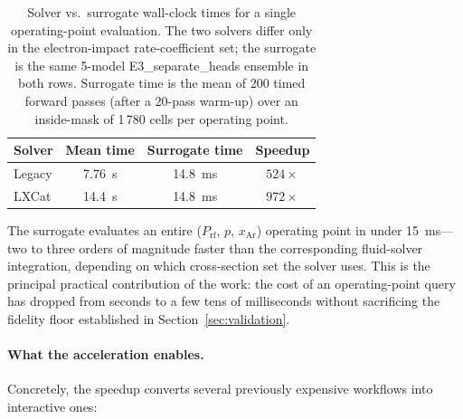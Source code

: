 \documentclass[12pt,a4paper]{article}
\begin{document}
\begin{table}[H]
  \centering
  \caption{Solver vs.\ surrogate wall-clock times for a single
operating-point evaluation.  The two solvers differ only in the
electron-impact rate-coefficient set; the surrogate is the same
5-model E3\_separate\_heads ensemble in both rows.  Surrogate time is
the mean of 200 timed forward passes (after a 20-pass warm-up) over an
inside-mask of 1\,780 cells per operating point.}
  \label{tab:speedup}
  \begin{tabular}{lccc}
    \toprule
    Solver & Mean time & Surrogate time & Speedup \\
    \midrule
    Legacy & \SI{7.76}{\second} & \SI{14.8}{\milli\second}
           & $524\times$ \\
    LXCat  & \SI{14.4}{\second} & \SI{14.8}{\milli\second}
           & $972\times$ \\
    \bottomrule
  \end{tabular}
\end{table}

The surrogate evaluates an entire (\(P_\mathrm{rf}\), \(p\),
\(x_\mathrm{Ar}\)) operating point in under \SI{15}{\milli\second}---two
to three orders of magnitude faster than the corresponding fluid-solver
integration, depending on which cross-section set the solver uses.  This
is the principal practical contribution of the work: the cost of an
operating-point query has dropped from seconds to a few tens of
milliseconds without sacrificing the fidelity floor established in
Section~\ref{sec:validation}.

\paragraph{What the acceleration enables.}
Concretely, the speedup converts several previously expensive workflows
into interactive ones:
\end{document}
